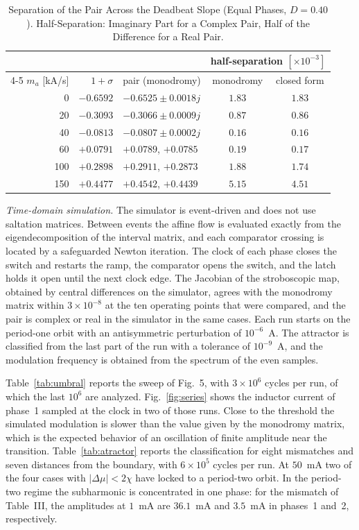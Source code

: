 \documentclass[journal]{IEEEtran}
\begin{document}
\begin{table}[!h]
\caption{Separation of the Pair Across the Deadbeat Slope (Equal Phases,
$D=0.40$). Half-Separation: Imaginary Part for a Complex Pair, Half of the
Difference for a Real Pair.}
\label{tab:tipo}
\centering
\footnotesize
\setlength{\tabcolsep}{3pt}
\begin{tabular}{@{}rrlcc@{}}
\toprule
 & & & \multicolumn{2}{c}{half-separation $[\times10^{-3}]$} \\
\cmidrule(l){4-5}
$m_a$ [kA/s] & $1+\sigma$ & pair (monodromy) & monodromy & closed form \\
\midrule
0 & $-0.6592$ & $-0.6525\pm0.0018j$ & $1.83$ & $1.83$ \\
20 & $-0.3093$ & $-0.3066\pm0.0009j$ & $0.87$ & $0.86$ \\
40 & $-0.0813$ & $-0.0807\pm0.0002j$ & $0.16$ & $0.16$ \\
60 & $+0.0791$ & $+0.0789$, $+0.0785$ & $0.19$ & $0.17$ \\
100 & $+0.2898$ & $+0.2911$, $+0.2873$ & $1.88$ & $1.74$ \\
150 & $+0.4477$ & $+0.4542$, $+0.4439$ & $5.15$ & $4.51$ \\
\bottomrule
\end{tabular}
\end{table}

\emph{Time-domain simulation.} The simulator is event-driven and does not
use saltation matrices. Between events the affine flow is evaluated exactly
from the eigendecomposition of the interval matrix, and each comparator
crossing is located by a safeguarded Newton iteration. The clock of each
phase closes the switch and restarts the ramp, the comparator opens the
switch, and the latch holds it open until the next clock edge. The Jacobian
of the stroboscopic map, obtained by central differences on the simulator,
agrees with the monodromy matrix within $3\times10^{-8}$ at the ten
operating points that were compared, and the pair is complex or real in the
simulator in the same cases. Each run starts on the period-one orbit with an
antisymmetric perturbation of $10^{-6}$~A. The attractor is classified from
the last part of the run with a tolerance of $10^{-9}$~A, and the modulation
frequency is obtained from the spectrum of the even samples.

Table~\ref{tab:umbral} reports the sweep of Fig.~5, with $3\times10^{6}$
cycles per run, of which the last $10^{6}$ are analyzed. Fig.~\ref{fig:series}
shows the inductor current of phase~1 sampled at the clock in two of those
runs. Close to the
threshold the simulated modulation is slower than the value given by the
monodromy matrix, which is the expected behavior of an oscillation of finite
amplitude near the transition. Table~\ref{tab:atractor} reports the
classification for eight mismatches and seven distances from the boundary,
with $6\times10^{5}$ cycles per run. At $50$~mA two of the four cases with
$\lvert\Delta\mu\rvert<2\chi$ have locked to a period-two orbit. In the
period-two regime the subharmonic is concentrated in one phase: for the
mismatch of Table~III, the amplitudes at $1$~mA are $36.1$~mA and $3.5$~mA
in phases~1 and~2, respectively.
\end{document}
